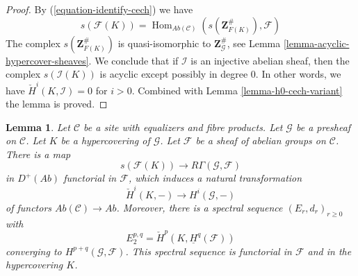 \documentclass[10pt,a4paper]{article}
\theoremstyle{plain}
\newtheorem{lemma}[subsection]{Lemma}
\theoremstyle{definition}
\theoremstyle{remark}
\numberwithin{equation}{subsection}
\def\Hom{\mathop{\mathrm{Hom}}\nolimits}
\begin{document}
\begin{proof}
By (\ref{equation-identify-cech}) we have
$$
s(\mathcal{F}(K))
=
\Hom_{\textit{Ab}(\mathcal{C})}(s(\mathbf{Z}_{F(K)}^\#), \mathcal{F})
$$
The complex $s(\mathbf{Z}_{F(K)}^\#)$ is quasi-isomorphic
to $\mathbf{Z}_\mathcal{G}^\#$, see
Lemma \ref{lemma-acyclic-hypercover-sheaves}. We conclude
that if $\mathcal{I}$ is an injective abelian sheaf, then
the complex $s(\mathcal{I}(K))$ is acyclic except possibly in degree $0$.
In other words, we have $\check{H}^i(K, \mathcal{I}) = 0$
for $i > 0$. Combined with Lemma \ref{lemma-h0-cech-variant}
the lemma is proved.
\end{proof}

\begin{lemma}
\label{lemma-cech-spectral-sequence-variant}
Let $\mathcal{C}$ be a site with equalizers and fibre products.
Let $\mathcal{G}$ be a presheaf on $\mathcal{C}$.
Let $K$ be a hypercovering of $\mathcal{G}$.
Let $\mathcal{F}$ be a sheaf of abelian groups on $\mathcal{C}$.
There is a map
$$
s(\mathcal{F}(K)) \longrightarrow R\Gamma(\mathcal{G}, \mathcal{F})
$$
in $D^{+}(\textit{Ab})$ functorial in $\mathcal{F}$, which induces
a natural transformation
$$
\check{H}^i(K, -) \longrightarrow H^i(\mathcal{G}, -)
$$
of functors $\textit{Ab}(\mathcal{C}) \to \textit{Ab}$. Moreover,
there is a spectral sequence $(E_r, d_r)_{r \geq 0}$ with
$$
E_2^{p, q} = \check{H}^p(K, \underline{H}^q(\mathcal{F}))
$$
converging to $H^{p + q}(\mathcal{G}, \mathcal{F})$.
This spectral sequence is functorial in $\mathcal{F}$ and
in the hypercovering $K$.
\end{lemma}
\end{document}
